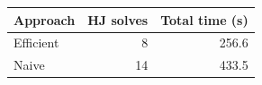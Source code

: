 \begin{tabular}{lrr}
\toprule
Approach & HJ solves & Total time (s) \\
\midrule
Efficient & 8 & 256.6 \\
Naive & 14 & 433.5 \\
\bottomrule
\end{tabular}
